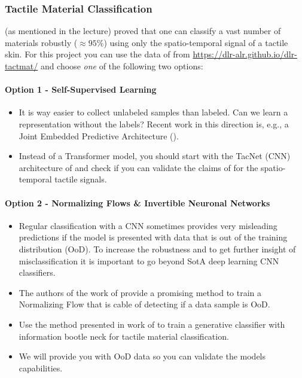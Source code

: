 \documentclass[a4paper]{article}
\begin{document}
\subsubsection{Tactile Material Classification}

\citet{Tulbure2018} (as mentioned in the lecture) proved that one can classify a vast number of materials robustly ($\approx 95 \%$) using only the spatio-temporal signal of a tactile skin.
For this project you can use the data of \citet{Tulbure2018} from \url{https://dlr-alr.github.io/dlr-tactmat/} and choose \emph{one} of the following two options: 

\paragraph{Option 1 - Self-Supervised Learning}
\begin{itemize}
  \item It is way easier to collect unlabeled samples than labeled. Can we learn a representation without the labels? Recent work in this direction is, e.g., a Joint Embedded Predictive Architecture (\citet{assran2023selfsupervised}).
  \item Instead of a Transformer model, you should start with the TacNet (CNN) architecture of \citet{Tulbure2018} and check if you can validate the claims of \citet{assran2023selfsupervised} for the spatio-temporal tactile signals. 
\end{itemize}

\paragraph{Option 2 - Normalizing Flows \& Invertible Neuronal Networks}
\begin{itemize}
  \item Regular classification with a CNN sometimes provides very misleading predictions if the model is presented with data that is out of the training distribution (OoD). To increase the robustness and to get further insight of misclassification it is important to go beyond SotA deep learning CNN classifiers.   
  \item The authors of the work of \citeauthor{mackowiak_generative_2021} provide a promising method to train a Normalizing Flow that is cable of detecting if a data sample is OoD.
  \item Use the method presented in work of \citeauthor{mackowiak_generative_2021} to train a generative classifier with information bootle neck for tactile material classification.
  \item We will provide you with OoD data so you can validate the models capabilities. 
\end{itemize}
\end{document}
